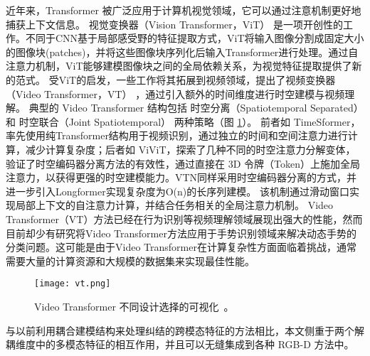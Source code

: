 近年来，Transformer \cite{vaswani2017attention}被广泛应用于计算机视觉领域，它可以通过注意机制更好地捕获上下文信息。
视觉变换器（Vision Transformer，ViT） \cite{vit2021image}是一项开创性的工作。不同于CNN基于局部感受野的特征提取方式，ViT将输入图像分割成固定大小的图像块(patches)，并将这些图像块序列化后输入Transformer进行处理。通过自注意力机制，ViT能够建模图像块之间的全局依赖关系，为视觉特征提取提供了新的范式。%
受ViT的启发，一些工作将其拓展到视频领域，提出了视频变换器（Video Transformer，VT）\cite{selva2023video} ，通过引入额外的时间维度进行时空建模与视频理解。
典型的 Video Transformer 结构包括 时空分离（Spatiotemporal Separated） 和 时空联合（Joint Spatiotemporal） 两种策略（图 \ref{fig:vt}）。
前者如 TimeSformer\cite{bertasius2021space}，率先使用纯Transformer结构用于视频识别，通过独立的时间和空间注意力进行计算，减少计算复杂度；后者如 ViViT\cite{arnab2021vivit}，探索了几种不同的时空注意力分解变体，验证了时空编码器分离方法的有效性，通过直接在 3D 令牌（Token）上施加全局注意力，以获得更强的时空建模能力。VTN\cite{neimark2021video}同样采用时空编码器分离的方式，并进一步引入Longformer实现复杂度为O(n)的长序列建模。
该机制通过滑动窗口实现局部上下文的自注意力计算，并结合任务相关的全局注意力机制。
Video Transformer（VT）方法已经在行为识别等视频理解领域展现出强大的性能，然而目前却少有研究将Video Transformer方法应用于手势识别领域来解决动态手势的分类问题。这可能是由于Video Transformer在计算复杂性方面面临着挑战，通常需要大量的计算资源和大规模的数据集来实现最佳性能\cite{khan2022transformers}。

\begin{figure}[htbp]
  \centering
  \texttt{[image: vt.png]}
  \caption{Video Transformer 不同设计选择的可视化~\cite{selva2023video}。} %
  \label{fig:vt}
\end{figure}

与以前利用耦合建模结构来处理纠结的跨模态特征的方法相比，本文侧重于两个解耦维度中的多模态特征的相互作用，并且可以无缝集成到各种 RGB-D 方法中。


